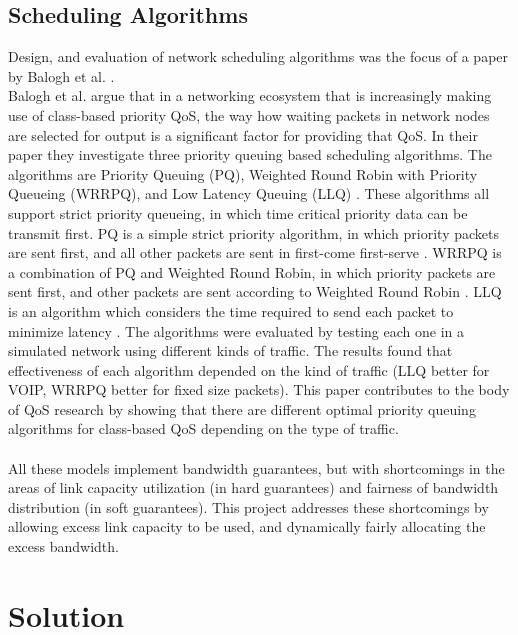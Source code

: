 \documentclass[accepted,single]{gipaper}
\begin{document}
\subsection{Scheduling Algorithms}
\label{algs}

Design, and evaluation of network scheduling algorithms was the focus of a paper by Balogh et al. \cite{Balogh}.
\\


Balogh et al. \cite{Balogh} argue that in a networking ecosystem that is increasingly making use of class-based priority QoS, the way how waiting packets in network nodes are selected for output is a significant factor for providing that QoS. In their paper they investigate three priority queuing based scheduling algorithms. The algorithms are Priority Queuing (PQ), Weighted Round Robin with Priority Queueing (WRRPQ), and Low Latency Queuing (LLQ) \cite{Balogh}. These algorithms all support strict priority queueing, in which time critical priority data can be transmit first. PQ is a simple strict priority algorithm, in which priority packets are sent first, and all other packets are sent in first-come first-serve \cite{Balogh}. WRRPQ is a combination of PQ and Weighted Round Robin, in which priority packets are sent first, and other packets are sent according to Weighted Round Robin \cite{Balogh}. LLQ is an algorithm which considers the time required to send each packet to minimize latency \cite{Balogh}. The algorithms were evaluated by testing each one in a simulated network using different kinds of traffic. The results found that effectiveness of each algorithm depended on the kind of traffic (LLQ better for VOIP, WRRPQ better for fixed size packets). This paper contributes to the body of QoS research by showing that there are different optimal priority queuing algorithms for class-based QoS depending on the type of traffic.
\\\\


\label{prev_work_conclusion}
All these models implement bandwidth guarantees, but with shortcomings in the areas of link capacity utilization (in hard guarantees) and fairness of bandwidth distribution (in soft guarantees). This project addresses these shortcomings by allowing excess link capacity to be used, and dynamically fairly allocating the excess bandwidth.

\section{Solution}
\label{solution}
\end{document}
